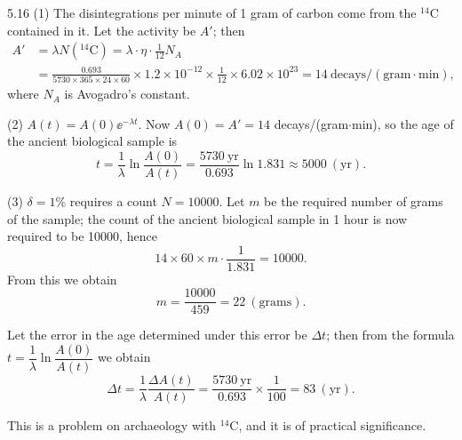 \begin{solution}{5.16}
(1) The disintegrations per minute of 1 gram of carbon come from the ${}^{14}\mathrm{C}$ contained
in it. Let the activity be $A'$; then
\begin{align*}
A'&=\lambda N({}^{14}\mathrm{C})=\lambda\cdot\eta\cdot\frac{1}{12}N_A\\
&=\frac{0.693}{5730\times 365\times 24\times 60}\times 1.2\times10^{-12}\times\frac{1}{12}
\times 6.02\times10^{23}=14\ \text{decays}/(\text{gram}\cdot\text{min}),
\end{align*}
where $N_A$ is Avogadro's constant.

(2) $A(t)=A(0)\ee^{-\lambda t}$. Now $A(0)=A'=14$ decays/(gram$\cdot$min), so the age of the
ancient biological sample is
\begin{equation*}
t=\frac{1}{\lambda}\ln\frac{A(0)}{A(t)}=\frac{5730\ \text{yr}}{0.693}\ln 1.831\approx 5000\ (\text{yr}).
\end{equation*}

(3) $\delta=1\%$ requires a count $N=10000$. Let $m$ be the required number of grams of the
sample; the count of the ancient biological sample in 1 hour is now required to be 10000, hence
\begin{equation*}
14\times 60\times m\cdot\frac{1}{1.831}=10000.
\end{equation*}
From this we obtain
\begin{equation*}
m=\frac{10000}{459}=22\ (\text{grams}).
\end{equation*}

Let the error in the age determined under this error be $\Delta t$; then from the formula
$t=\dfrac{1}{\lambda}\ln\dfrac{A(0)}{A(t)}$ we obtain
\begin{equation*}
\Delta t=\frac{1}{\lambda}\frac{\Delta A(t)}{A(t)}
=\frac{5730\ \text{yr}}{0.693}\times\frac{1}{100}=83\ (\text{yr}).
\end{equation*}

\begin{commentary}
This is a problem on archaeology with ${}^{14}\mathrm{C}$, and it is of practical significance.
\end{commentary}
\end{solution}

